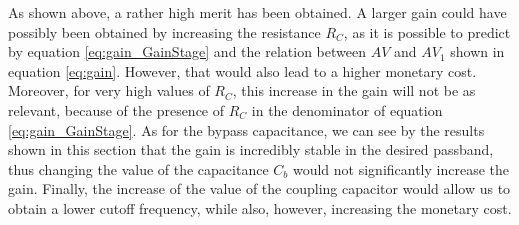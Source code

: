 As shown above, a rather high merit has been obtained. A larger gain could have possibly been obtained by increasing the resistance $R_C$, as it is possible to predict by equation \ref{eq:gain_GainStage} and the relation between $AV$ and $AV_1$ shown in equation \ref{eq:gain}. However, that would also lead to a higher monetary cost. Moreover, for very high values of $R_C$, this increase in the gain will not be as relevant, because of the presence of $R_C$ in the denominator of equation \ref{eq:gain_GainStage}. As for the bypass capacitance, we can see by the results shown in this section that the gain is incredibly stable in the desired passband, thus changing the value of the capacitance $C_b$ would not significantly increase the gain. Finally, the increase of the value of the coupling capacitor would allow us to obtain a lower cutoff frequency, while also, however, increasing the monetary cost.
